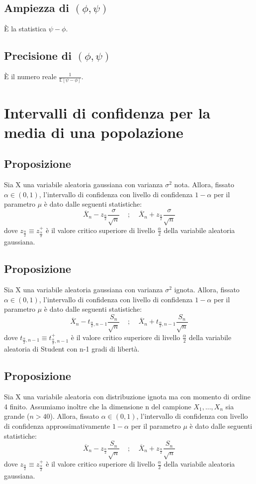 \documentclass{article}
\begin{document}
\subsection*{Ampiezza di $(\phi, \psi)$}
\`E la statistica $\psi-\phi$.

\subsection*{Precisione di $(\phi, \psi)$}
\`E il numero reale $\frac{1}{\mathbb{E}[\psi-\phi]}$.

\section*{Intervalli di confidenza per la media di una popolazione}
\subsection*{Proposizione}
Sia X una variabile aleatoria gaussiana con varianza $\sigma^{2}$ nota. Allora, fissato $\alpha \in (0,1)$, l'intervallo di confidenza con livello di confidenza $1-\alpha$ per il parametro $\mu$ è dato dalle seguenti statistiche:
\[ \overline{X}_{n} - z_{\frac{\alpha}{2}}\frac{\sigma}{\sqrt{n}} \; \; \; \; ; \; \; \; \; \overline{X}_{n} + z_{\frac{\alpha}{2}}\frac{\sigma}{\sqrt{n}} \]
dove $z_{\frac{\alpha}{2}} \equiv z_{\frac{\alpha}{2}}^{+}$ è il valore critico superiore di livello $\frac{\alpha}{2}$ della variabile aleatoria gaussiana.

\subsection*{Proposizione}
Sia X una variabile aleatoria gaussiana con varianza $\sigma^{2}$ ignota. Allora, fissato $\alpha \in (0,1)$, l'intervallo di confidenza con livello di confidenza $1-\alpha$ per il parametro $\mu$ è dato dalle seguenti statistiche:
\[ \overline{X}_{n} - t_{\frac{\alpha}{2},n-1}\frac{S_{n}}{\sqrt{n}} \; \; \; \; ; \; \; \; \; \overline{X}_{n} + t_{\frac{\alpha}{2},n-1}\frac{S_{n}}{\sqrt{n}} \]
dove $t_{\frac{\alpha}{2},n-1} \equiv t_{\frac{\alpha}{2},n-1}^{+}$ è il valore critico superiore di livello $\frac{\alpha}{2}$ della variabile aleatoria di Student con n-1 gradi di libertà.

\subsection*{Proposizione}
Sia X una variabile aleatoria con distribuzione ignota ma con momento di ordine 4 finito. Assumiamo inoltre che la dimensione n del campione $X_{1},...,X_{n}$ sia grande ($n>40$). Allora, fissato $\alpha \in (0,1)$, l'intervallo di confidenza con livello di confidenza approssimativamente $1-\alpha$ per il parametro $\mu$ è dato dalle seguenti statistiche:
\[ \overline{X}_{n} - z_{\frac{\alpha}{2}}\frac{S_{n}}{\sqrt{n}} \; \; \; \; ; \; \; \; \; \overline{X}_{n} + z_{\frac{\alpha}{2}}\frac{S_{n}}{\sqrt{n}} \]
dove $z_{\frac{\alpha}{2}} \equiv z_{\frac{\alpha}{2}}^{+}$ è il valore critico superiore di livello $\frac{\alpha}{2}$ della variabile aleatoria gaussiana.
\end{document}
